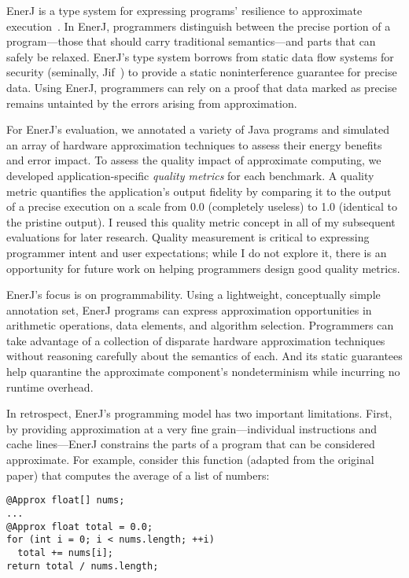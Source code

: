 EnerJ is a type system for expressing programs' resilience to approximate
execution~\cite{enerj}. In EnerJ, programmers distinguish between the precise
portion of a program---those that should carry traditional semantics---and
parts that can safely be relaxed. EnerJ's type system borrows from static data
flow systems for security (seminally, Jif~\cite{jif}) to provide a static
noninterference guarantee for precise data. Using EnerJ, programmers can rely
on a proof that data marked as precise remains untainted by the errors arising
from approximation.

For EnerJ's evaluation, we annotated a variety of Java
programs and simulated an array of hardware approximation techniques to assess
their energy benefits and error impact. To assess the quality impact of
approximate computing, we developed application-specific \emph{quality
metrics} for each benchmark. A quality metric quantifies the application's
output fidelity by comparing it to the output of a precise execution on a
scale from 0.0 (completely useless) to 1.0 (identical to the pristine output).
I reused this quality metric concept in all of my subsequent evaluations for
later research. Quality measurement is critical to expressing programmer
intent and user expectations; while I do not explore it, there is an
opportunity for future work on helping programmers design good quality
metrics.

EnerJ's focus is on programmability. Using a lightweight, conceptually simple
annotation set, EnerJ programs can express approximation opportunities in
arithmetic operations, data elements, and algorithm selection. Programmers can
take advantage of a collection of disparate hardware approximation techniques
without reasoning carefully about the semantics of each. And its static
guarantees help quarantine the approximate component's nondeterminism while
incurring no runtime overhead.

In retrospect, EnerJ's programming model has two important limitations. First,
by providing approximation at a very fine grain---individual instructions and
cache lines---EnerJ constrains the parts of a program that can be
considered approximate. For example, consider this function (adapted from the original
paper) that computes the average of a list of numbers:

\begin{lstlisting}
@Approx float[] nums;
...
@Approx float total = 0.0;
for (int i = 0; i < nums.length; ++i)
  total += nums[i];
return total / nums.length;
\end{lstlisting}

